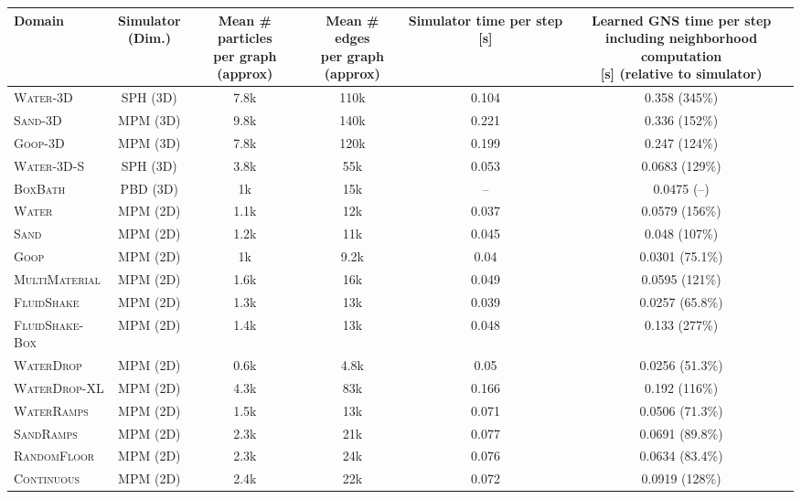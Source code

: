 \documentclass{article}
\newcommand{\multiline}[3][11mm]{\begin{minipage}[c][#1]{#2}#3\end{minipage}}
\newcommand\domain[1]{\textsc{#1}}
\begin{document}
\begin{center}
\begin{tabular}[p]{|l||c|c|c|c|c|}
	\hline
	\textbf{Domain} &  
	\multiline{15mm}{\centering\textbf{Simulator \\ (Dim.)}} & 
	\multiline{15mm}{\centering\textbf{Mean \# particles\\per graph\\(approx)}} &
	\multiline{15mm}{\centering\textbf{Mean \# edges\\per graph\\(approx)}} &
	\multiline{15mm}{\centering\textbf{Simulator time per step [s]}} &
	\multiline[18mm]{56mm}{\centering\textbf{Learned GNS time per step \\ including neighborhood computation \\ {[s]} (relative to simulator)}} \\\hline\hline
    \domain{Water-3D} & SPH (3D) & 7.8k & 110k & 0.104 & 0.358 (345\%) \\\hline
    \domain{Sand-3D} & MPM (3D) & 9.8k & 140k & 0.221 & 0.336 (152\%) \\\hline
    \domain{Goop-3D} & MPM (3D) & 7.8k & 120k & 0.199 & 0.247 (124\%) \\\hline
    \domain{Water-3D-S} & SPH (3D) & 3.8k & 55k & 0.053 & 0.0683 (129\%) \\\hline
    \domain{BoxBath} & PBD (3D) & 1k & 15k & -- & 0.0475 (--) \\\hline
    \domain{Water} & MPM (2D) & 1.1k & 12k & 0.037 & 0.0579 (156\%) \\\hline
    \domain{Sand} & MPM (2D) & 1.2k & 11k & 0.045 & 0.048 (107\%) \\\hline
    \domain{Goop} & MPM (2D) & 1k & 9.2k & 0.04 & 0.0301 (75.1\%) \\\hline
    \domain{MultiMaterial} & MPM (2D) & 1.6k & 16k & 0.049 & 0.0595 (121\%) \\\hline
    \domain{FluidShake} & MPM (2D) & 1.3k & 13k & 0.039 & 0.0257 (65.8\%) \\\hline
    \domain{FluidShake-Box} & MPM (2D) & 1.4k & 13k & 0.048 & 0.133 (277\%) \\\hline
    \domain{WaterDrop} & MPM (2D) & 0.6k & 4.8k & 0.05 & 0.0256 (51.3\%) \\\hline
    \domain{WaterDrop-XL} & MPM (2D) & 4.3k & 83k & 0.166 & 0.192 (116\%) \\\hline
    \domain{WaterRamps} & MPM (2D) & 1.5k & 13k & 0.071 & 0.0506 (71.3\%) \\\hline
    \domain{SandRamps} & MPM (2D) & 2.3k & 21k & 0.077 & 0.0691 (89.8\%) \\\hline
    \domain{RandomFloor} & MPM (2D) & 2.3k & 24k & 0.076 & 0.0634 (83.4\%) \\\hline
    \domain{Continuous} & MPM (2D) & 2.4k & 22k & 0.072 & 0.0919 (128\%) \\\hline
\end{tabular}
\end{center}
\end{document}
